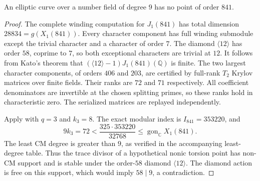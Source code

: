 \begin{proposition}\label{prop:nonic-no841}
An elliptic curve over a number field of degree $9$ has no point of order $841$.
\end{proposition}
\begin{proof}
The complete winding computation for $J_1(841)$ has total dimension
$28834=g(X_1(841))$. Every character component has full winding
submodule except the trivial character and a character of order $7$.
The diamond $\langle12\rangle$ has order $58$, coprime to $7$, so
both exceptional characters are trivial at $12$.
It follows from Kato's theorem that
$(\langle12\rangle-1)J_1(841)(\mathbb Q)$ is finite.
The two largest character components, of orders $406$ and $203$,
are certified by full-rank $T_2$ Krylov matrices over finite fields.
Their ranks are $72$ and $71$ respectively. All coefficient denominators
are invertible at the chosen splitting primes, so these ranks hold
in characteristic zero. The serialized matrices are replayed independently.

Apply \cite[Proposition~4.4]{DN} with $q=3$ and $k_3=8$.
The exact modular index is $I_{841}=353220$, and
\[
 9k_3=72<\frac{325\cdot353220}{32768}
       \leq\operatorname{gon}_{\mathbb C}X_1(841).
\]
The least CM degree is greater than $9$, as verified in the
accompanying least-degree table. Thus the trace divisor of a
hypothetical nonic torsion point has non-CM support and is stable
under the order-$58$ diamond $\langle12\rangle$.
The diamond action is free on this support, which would imply
$58\mid9$, a contradiction.
\end{proof}
